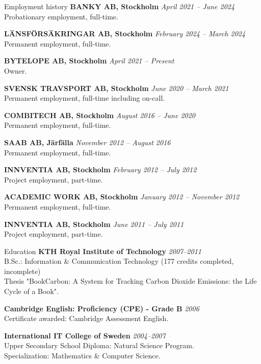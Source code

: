 \documentclass{resume}
\begin{document}
  \begin{rSection}{Employment history}
    {\bf BANKY AB, Stockholm}
    \hfill {\em April 2021 -- June 2024 } \\
    { Probationary employment, full-time. }

    {\bf LÄNSFÖRSÄKRINGAR AB, Stockholm}
    \hfill {\em February 2024 -- March 2024 } \\
    { Permanent employment, full-time. }

    {\bf BYTELOPE AB, Stockholm}
    \hfill {\em April 2021 -- Present } \\
    { Owner. }

    {\bf SVENSK TRAVSPORT AB, Stockholm}
    \hfill {\em June 2020 -- March 2021 } \\
    { Permanent employment, full-time including on-call. }

    {\bf COMBITECH AB, Stockholm}
    \hfill {\em August 2016 -- June 2020 } \\
    { Permanent employment, full-time. }

    {\bf SAAB AB, Järfälla}
    \hfill {\em November 2012 -- August 2016 } \\
    { Permanent employment, full-time. }

    {\bf INNVENTIA AB, Stockholm}
    \hfill {\em February 2012 -- July 2012 } \\
    { Project employment, part-time. }

    {\bf ACADEMIC WORK AB, Stockholm}
    \hfill {\em January 2012 -- November 2012 } \\
    { Permanent employment, full-time. }

    {\bf INNVENTIA AB, Stockholm}
    \hfill {\em June 2011 -- July 2011 } \\
    { Project employment, part-time. }
  \end{rSection}

  \begin{rSection}{Education}
  {\bf KTH Royal Institute of Technology}
    \hfill {\em 2007--2011 } \\
    { B.Sc.: Information \& Communication Technology (177 credits completed, incomplete) } \\
    { Thesis "BookCarbon: A System for Tracking Carbon Dioxide Emissions: the Life Cycle of a Book". }

    {\bf Cambridge English: Proficiency (CPE) - Grade B}
    \hfill {\em 2006 } \\
    { Certificate awarded: Cambridge Assessment English. }

    {\bf International IT College of Sweden}
    \hfill {\em 2004--2007 } \\
    { Upper Secondary School Diploma: Natural Science Program. } \\
    { Specialization: Mathematics \& Computer Science. }
  \end{rSection}
\end{document}
